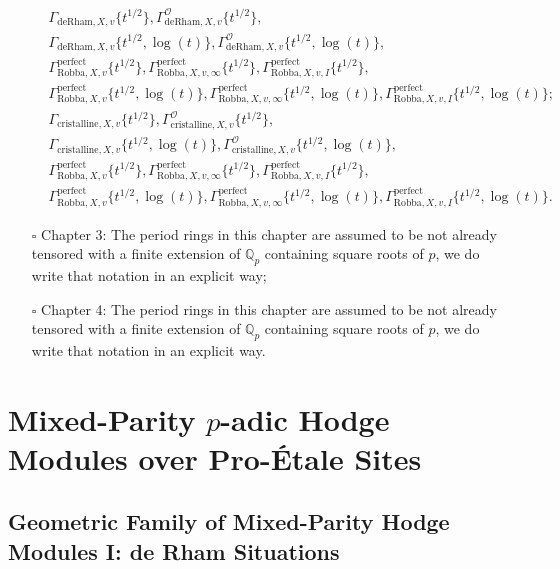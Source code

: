 \documentclass[12pt]{book}
\theoremstyle{definition}
\begin{document}
\begin{itemize}
\begin{align}
&\Gamma_{\text{deRham},X,v}\{t^{1/2}\},\Gamma^\mathcal{O}_{\text{deRham},X,v}\{t^{1/2}\},\\
&\Gamma_{\text{deRham},X,v}\{t^{1/2},\log(t)\},\Gamma^\mathcal{O}_{\text{deRham},X,v}\{t^{1/2},\log(t)\},\\
&\Gamma^\mathrm{perfect}_{\text{Robba},X,v}\{t^{1/2}\},\Gamma^\mathrm{perfect}_{\text{Robba},X,v,\infty}\{t^{1/2}\},\Gamma^\mathrm{perfect}_{\text{Robba},X,v,I}\{t^{1/2}\},\\
&\Gamma^\mathrm{perfect}_{\text{Robba},X,v}\{t^{1/2},\log(t)\},\Gamma^\mathrm{perfect}_{\text{Robba},X,v,\infty}\{t^{1/2},\log(t)\},\Gamma^\mathrm{perfect}_{\text{Robba},X,v,I}\{t^{1/2},\log(t)\};
\end{align}
\begin{align}
&\Gamma_{\text{cristalline},X,v}\{t^{1/2}\},\Gamma^\mathcal{O}_{\text{cristalline},X,v}\{t^{1/2}\},\\
&\Gamma_{\text{cristalline},X,v}\{t^{1/2},\log(t)\},\Gamma^\mathcal{O}_{\text{cristalline},X,v}\{t^{1/2},\log(t)\},\\
&\Gamma^\mathrm{perfect}_{\text{Robba},X,v}\{t^{1/2}\},\Gamma^\mathrm{perfect}_{\text{Robba},X,v,\infty}\{t^{1/2}\},\Gamma^\mathrm{perfect}_{\text{Robba},X,v,I}\{t^{1/2}\},\\
&\Gamma^\mathrm{perfect}_{\text{Robba},X,v}\{t^{1/2},\log(t)\},\Gamma^\mathrm{perfect}_{\text{Robba},X,v,\infty}\{t^{1/2},\log(t)\},\Gamma^\mathrm{perfect}_{\text{Robba},X,v,I}\{t^{1/2},\log(t)\}.
\end{align}
\item[$\square$] Chapter 3: The period rings in this chapter are assumed to be not already tensored with a finite extension of $\mathbb{Q}_p$ containing square roots of $p$,  we do write that notation in an explicit way;
\item[$\square$] Chapter 4: The period rings in this chapter are assumed to be not already tensored with a finite extension of $\mathbb{Q}_p$ containing square roots of $p$,  we do write that notation in an explicit way.
\end{itemize}




\chapter{Mixed-Parity $p$-adic Hodge Modules over Pro-\'Etale Sites}



\newpage
\section{Geometric Family of Mixed-Parity Hodge Modules I: de Rham Situations}
\end{document}
